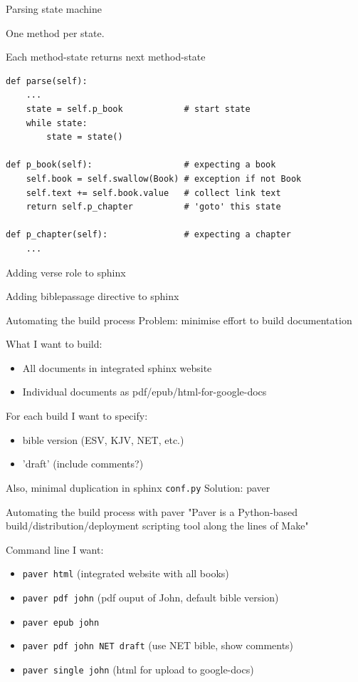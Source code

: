 \documentclass{beamer}
\begin{document}
\begin{frame}[fragile]{Parsing state machine}

One method per state.

Each method-state returns next method-state

\begin{verbatim}
def parse(self):
    ...
    state = self.p_book            # start state
    while state:
        state = state()
		
def p_book(self):                  # expecting a book
    self.book = self.swallow(Book) # exception if not Book
    self.text += self.book.value   # collect link text
    return self.p_chapter          # 'goto' this state
	
def p_chapter(self):               # expecting a chapter
    ...
\end{verbatim}
\end{frame}

\begin{frame}{Adding verse role to sphinx}
\end{frame}

\begin{frame}{Adding biblepassage directive to sphinx}
\end{frame}

\begin{frame}{Automating the build process}
Problem: minimise effort to build documentation

What I want to build:
\begin{itemize}
\item All documents in integrated sphinx website
\item Individual documents as pdf/epub/html-for-google-docs
\end{itemize}
For each build I want to specify:
\begin{itemize}
\item bible version (ESV, KJV, NET, etc.)
\item 'draft' (include comments?)
\end{itemize}
Also, minimal duplication in sphinx \texttt{conf.py}
Solution: paver

\end{frame}

\begin{frame}{Automating the build process with paver}
"Paver is a Python-based build/distribution/deployment 
scripting tool along the lines of Make"

Command line I want:
\begin{itemize}
\item \texttt{paver html} (integrated website with all books)
\item \texttt{paver pdf john} (pdf ouput of John, default bible version)
\item \texttt{paver epub john}
\item \texttt{paver pdf john NET draft} (use NET bible, show comments)
\item \texttt{paver single john} (html for upload to google-docs)
\end{itemize}

\end{frame}
\end{document}
